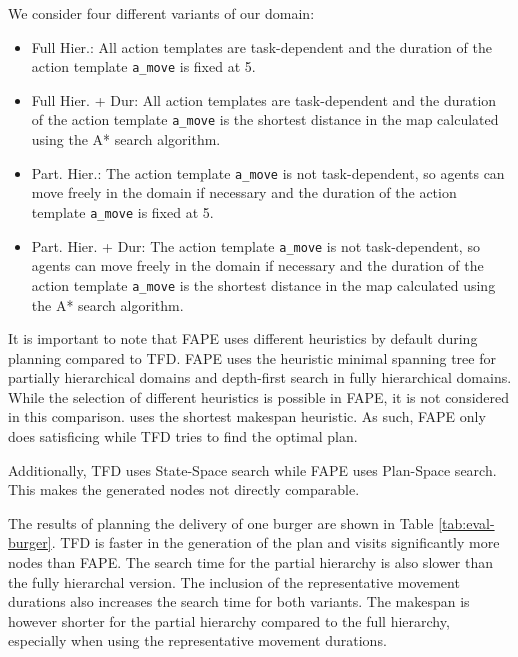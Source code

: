 We consider four different variants of our domain:
\begin{itemize}
  \item Full Hier.: All action templates are task-dependent and the duration of the action template \verb|a_move| is fixed at 5.
  \item Full Hier. + Dur: All action templates are task-dependent and the duration of the action template \verb|a_move| is the shortest distance in the map calculated using the A* search algorithm. 
  \item Part. Hier.: The action template \verb|a_move| is not task-dependent, so agents can move freely in the domain if necessary and the duration of the action template \verb|a_move| is fixed at 5.
  \item Part. Hier. + Dur: The action template \verb|a_move| is not task-dependent, so agents can move freely in the domain if necessary and the duration of the action template \verb|a_move| is the shortest distance in the map calculated using the A* search algorithm. 
\end{itemize}

It is important to note that FAPE uses different heuristics by default during planning compared to TFD.
FAPE uses the heuristic minimal spanning tree for partially hierarchical domains and depth-first search in fully hierarchical domains.
While the selection of different heuristics is possible in FAPE, it is not considered in this comparison.
\cite{yuxinliuPlanningOvercookedGame2020} uses the shortest makespan heuristic.
As such, FAPE only does satisficing while TFD tries to find the optimal plan.

Additionally, TFD uses State-Space search while FAPE uses Plan-Space search.
This makes the generated nodes not directly comparable.

The results of planning the delivery of one burger are shown in Table \ref{tab:eval-burger}.
TFD is faster in the generation of the plan and visits significantly more nodes than FAPE.
The search time for the partial hierarchy is also slower than the fully hierarchal version.
The inclusion of the representative movement durations also increases the search time for both variants.
The makespan is however shorter for the partial hierarchy compared to the full hierarchy, especially when using the representative movement durations.


